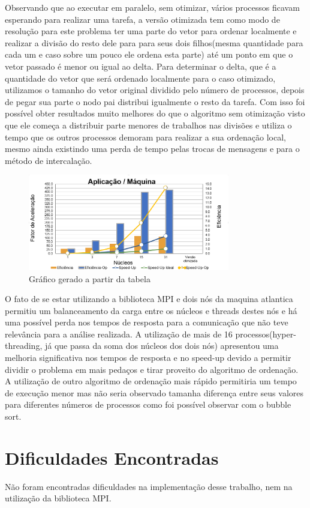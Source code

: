 \documentclass[9pt]{IEEEtran}
\begin{document}
	Observando que ao executar em paralelo, sem otimizar, vários processos
	ficavam esperando para realizar uma tarefa, a versão otimizada tem como modo
	de resolução para este problema ter uma parte do vetor para ordenar
	localmente e realizar a divisão do resto dele para para seus dois
	filhos(mesma quantidade para cada um e caso sobre um pouco ele ordena esta
	parte) até um ponto em que o vetor passado é menor ou igual ao delta. Para
	determinar o delta, que é a quantidade do vetor que será ordenado localmente
	para o caso otimizado, utilizamos o tamanho do vetor original dividido pelo
	número de processos, depois de pegar sua parte o nodo pai distribui
	igualmente o resto da tarefa. Com isso foi possível obter resultados muito
	melhores do que o algoritmo sem otimização visto que ele começa a distribuir
	parte menores de trabalhos nas divisões e utiliza o tempo que os outros
	processos  demoram para realizar a sua ordenação local, mesmo ainda
	existindo uma perda de tempo pelas trocas de mensagens e para o método de
	intercalação.

	\begin{figure}[H]
		\centering
		\includegraphics[width=88mm]{doc/graph.PNG}
		\caption{Gráfico gerado a partir da tabela}
		\label{fig_graph}
	\end{figure}

	O fato de se estar utilizando a biblioteca MPI e dois nós da maquina
	atlantica permitiu um balanceamento da carga entre os núcleos e threads
	destes nós e há uma possível perda nos tempos de resposta para a comunicação
	que não teve relevância para a análise realizada. A utilização de mais de 16
	processos(hyper-threading, já que passa da soma dos núcleos dos dois nós)
	apresentou uma melhoria significativa nos tempos de resposta e no speed-up
	devido a permitir dividir o problema em mais pedaços e tirar proveito do
	algoritmo de ordenação. A utilização de outro algoritmo de ordenação mais
	rápido permitiria um tempo de execução menor mas não seria observado tamanha
	diferença entre seus valores para diferentes números de processos como foi
	possível observar com o bubble sort.


\section{Dificuldades Encontradas}

	Não foram encontradas dificuldades na implementação desse trabalho, nem na
	utilização da biblioteca MPI\@.
\end{document}
